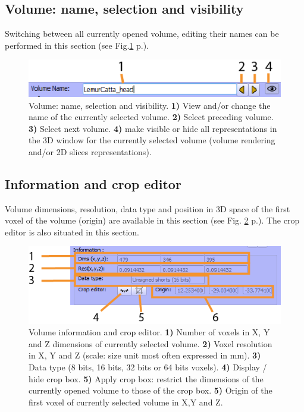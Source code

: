 \subsection{Volume: name, selection and visibility}
Switching between all currently opened volume, editing their names can be performed in this section (see Fig.\ref{volume_name} p.\pageref{volume_name}).
\begin{figure}
  \centering
  \includegraphics[scale=1]{images/14/volume_name2.png}
\caption{Volume: name, selection and visibility. \textbf{1)} View and/or change the name of the currently selected volume.  \textbf{2)} Select preceding volume.  \textbf{3)} Select next volume. \textbf{4)} make visible or hide all representations in the 3D window for the currently selected volume (volume rendering and/or 2D slices representations). }	
\label{volume_name}
 \end{figure}

\subsection{Information and crop editor}
Volume dimensions, resolution, data type and position in 3D space of the first voxel of the volume (origin) are available in this section (see Fig. \ref{volume_information} p.\pageref{volume_information}). The crop editor is also situated in this section. 
\begin{figure}
  \centering
  \includegraphics[scale=1]{images/14/volume_information2.png}
\caption{Volume information and crop editor. \textbf{1)} Number of voxels in X, Y and Z dimensions of currently selected volume.   \textbf{2)} Voxel resolution in X, Y and Z (scale: size unit most often expressed in mm). \textbf{3)} Data type (8 bits, 16 bits, 32 bits or 64 bits voxels).  \textbf{4)} Display / hide crop box. \textbf{5)} Apply crop box: restrict the dimensions of the currently opened volume to those of the crop box. \textbf{5)} Origin of the first voxel of currently selected volume in X,Y and Z. }	
\label{volume_information}
 \end{figure}


